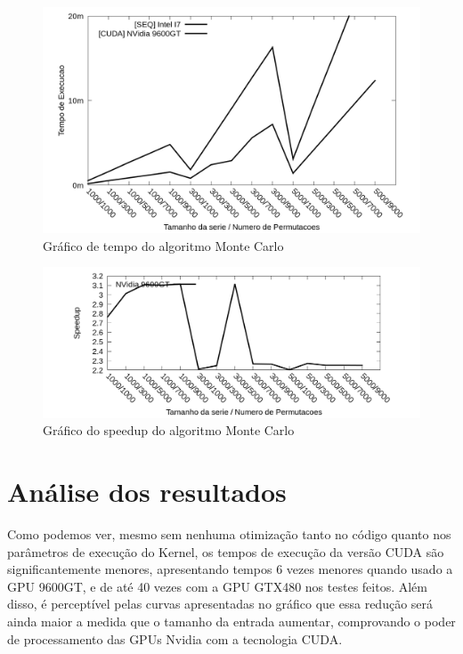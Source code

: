 \begin{figure}[H]
\centering
\includegraphics[width=1.0\textwidth]{Imagens/graficos_mcarlo/mcarlo_tempos_cuda.png}
\caption{Gráfico de tempo do algoritmo Monte Carlo}
\label{fig:grafico_tempo_mcarlo_cuda}
\end{figure}

\begin{figure}[H]
\centering
\includegraphics[width=1.0\textwidth]{Imagens/graficos_mcarlo/mcarlo_speedup_cuda.png}
\caption{Gráfico do speedup do algoritmo Monte Carlo}
\label{fig:grafico_speedup_mcarlo_cuda}
\end{figure}

\section{Análise dos resultados}

Como podemos ver, mesmo sem nenhuma otimização tanto no código quanto nos parâmetros de execução do Kernel, os tempos de execução da versão CUDA são significantemente menores, apresentando tempos 6 vezes menores quando usado a GPU 9600GT, e de até 40 vezes com a GPU GTX480 nos testes feitos. Além disso, é perceptível pelas curvas apresentadas no gráfico que essa redução será ainda maior a medida que o tamanho da entrada aumentar, comprovando o poder de processamento das GPUs Nvidia com a tecnologia CUDA.